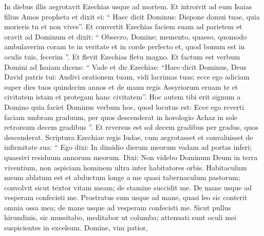 \begin{biblechapter}
\begin{biblechapter}
\begin{biblechapter}
\begin{biblechapter}
\begin{biblechapter}
\begin{biblechapter}
\begin{biblechapter}
\begin{biblechapter}
\begin{biblechapter}
\begin{biblechapter}
\begin{biblechapter}
\begin{biblechapter}
\begin{biblechapter}
\begin{biblechapter}
\begin{biblechapter}
\begin{biblechapter}
\begin{biblechapter}
\begin{biblechapter}
\begin{biblechapter}
\begin{biblechapter}
\begin{biblechapter}
\begin{biblechapter}
\begin{biblechapter}
\begin{biblechapter}
\begin{biblechapter}
\begin{biblechapter}
\begin{biblechapter}
\begin{biblechapter}
\begin{biblechapter}
\begin{biblechapter}
\begin{biblechapter}
\begin{biblechapter}
\begin{biblechapter}
\begin{biblechapter}
\begin{biblechapter}
\begin{biblechapter}
\begin{biblechapter}
\begin{biblechapter}
\verse In diebus illis aegrotavit Ezechias usque ad mortem. Et introivit ad eum Isaias filius Amos propheta et dixit ei: “ Haec dicit Dominus: Dispone domui tuae, quia morieris tu et non vives”. 
\verse Et convertit Ezechias faciem suam ad parietem et oravit ad Dominum 
\verse et dixit: “ Obsecro, Domine; memento, quaeso, quomodo ambulaverim coram te in veritate et in corde perfecto et, quod bonum est in oculis tuis, fecerim ”. Et flevit Ezechias fletu magno.
 \verse Et factum est verbum Domini ad Isaiam dicens: 
\verse “ Vade et dic Ezechiae: “Haec dicit Dominus, Deus David patris tui: Audivi orationem tuam, vidi lacrimas tuas; ecce ego adiciam super dies tuos quindecim annos 
\verse et de manu regis Assyriorum eruam te et civitatem istam et protegam hanc civitatem”. 
\verse Hoc autem tibi erit signum a Domino quia faciet Dominus verbum hoc, quod locutus est: 
\verse Ecce ego reverti faciam umbram graduum, per quos descenderat in horologio Achaz in sole retrorsum decem gradibus ”. Et reversus est sol decem gradibus per gradus, quos descenderat.
 \verse Scriptura Ezechiae regis Iudae, cum aegrotasset et convaluisset de infirmitate sua:
 \verse “ Ego dixi: In dimidio dierum meorum
 vadam ad portas inferi;
 quaesivi residuum annorum meorum.
 \verse Dixi: Non videbo Dominum Deum in terra viventium,
 non aspiciam hominem ultra
 inter habitatores orbis.
 \verse Habitaculum meum ablatum est et abductum longe a me
 quasi tabernaculum pastorum;
 convolvit sicut textor vitam meam;
 de stamine succidit me.
 De mane usque ad vesperam confecisti me.
 \verse Prostratus sum usque ad mane,
 quasi leo sic conterit omnia ossa mea;
 de mane usque ad vesperam confecisti me.
 \verse Sicut pullus hirundinis, sic mussitabo,
 meditabor ut columba;
 attenuati sunt oculi mei
 suspicientes in excelsum.
 Domine, vim patior,

\end{biblechapter}
\end{biblechapter}
\end{biblechapter}
\end{biblechapter}
\end{biblechapter}
\end{biblechapter}
\end{biblechapter}
\end{biblechapter}
\end{biblechapter}
\end{biblechapter}
\end{biblechapter}
\end{biblechapter}
\end{biblechapter}
\end{biblechapter}
\end{biblechapter}
\end{biblechapter}
\end{biblechapter}
\end{biblechapter}
\end{biblechapter}
\end{biblechapter}
\end{biblechapter}
\end{biblechapter}
\end{biblechapter}
\end{biblechapter}
\end{biblechapter}
\end{biblechapter}
\end{biblechapter}
\end{biblechapter}
\end{biblechapter}
\end{biblechapter}
\end{biblechapter}
\end{biblechapter}
\end{biblechapter}
\end{biblechapter}
\end{biblechapter}
\end{biblechapter}
\end{biblechapter}
\end{biblechapter}
